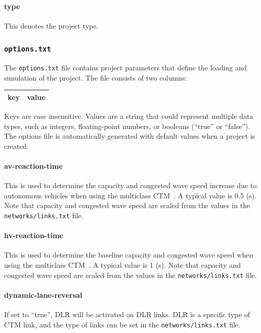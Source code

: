 \paragraph*{type}
This denotes the project type.


\subsubsection{\texttt{options.txt}}
The \texttt{options.txt} file contains project parameters that define the loading and simulation of the project. The file consists of two columns:
\begin{center}
\begin{tabular}{cc}
\hline
key & value\\\hline
\end{tabular}
\end{center}
Keys are case insensitive. Values are a string that could represent multiple data types, such as integers, floating-point numbers, or booleans (``true'' or ``false''). The options file is automatically generated with default values when a project is created. 

\paragraph*{av-reaction-time}
This is used to determine the capacity and congested wave speed increase due to autonomous vehicles when using the multiclass CTM~\cite{levin2016multiclass}. A typical value is 0.5 (s). Note that capacity and congested wave speed are scaled from the values in the \texttt{networks/links.txt} file.

\paragraph*{hv-reaction-time}
This is used to determine the baseline capacity and congested wave speed when using the multiclass CTM~\cite{levin2016multiclass}. A typical value is 1 (s). Note that capacity and congested wave speed are scaled from the values in the \texttt{networks/links.txt} file.

\paragraph*{dynamic-lane-reversal}
If set to ``true'', DLR will be activated on DLR links. DLR is a specific type of CTM link, and the type of links can be set in the \texttt{networks/links.txt} file.


